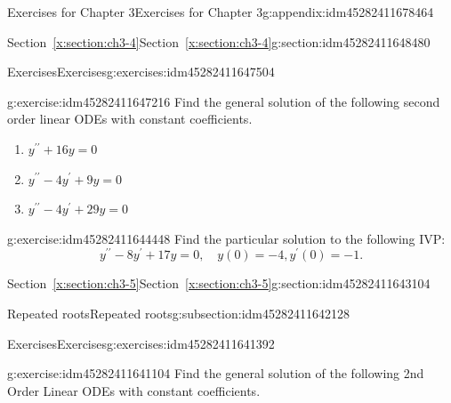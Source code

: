 \documentclass[oneside,10pt,]{book}
\numberwithin{equation}{section}
\numberwithin{equation}{section}
\begin{document}
\begin{appendixptx}{Exercises for Chapter 3}{}{Exercises for Chapter 3}{}{}{g:appendix:idm45282411678464}
\begin{sectionptx}{Section~\ref*{x:section:ch3-4}}{}{Section~\ref*{x:section:ch3-4}}{}{}{g:section:idm45282411648480}
%
%
\typeout{************************************************}
\typeout{************************************************}
%
\begin{exercises-subsection-numberless}{Exercises}{}{Exercises}{}{}{g:exercises:idm45282411647504}
\begin{divisionexercise}{1}{}{}{g:exercise:idm45282411647216}%
Find the general solution of the following second order linear ODEs with constant coefficients. %
\begin{enumerate}[label=(\alph*)]
\item{}\({\displaystyle y^{\prime\prime}+16y=0}\)%
\item{}\(y^{\prime\prime}-4y^{\prime}+9y=0\)%
\item{}\(y^{\prime\prime}-4y^{\prime}+29y=0\)%
\end{enumerate}
\end{divisionexercise}%
\begin{divisionexercise}{2}{}{}{g:exercise:idm45282411644448}%
Find the particular solution to the following IVP:%
\begin{equation*}
{\displaystyle y^{\prime\prime}-8y^{\prime}+17y=0},\,\,\,\,\,\,y(0)=-4,y^{\prime}(0)=-1.
\end{equation*}
\end{divisionexercise}%
\end{exercises-subsection-numberless}
\end{sectionptx}
%
%
\typeout{************************************************}
\typeout{************************************************}
%
\begin{sectionptx}{Section~\ref*{x:section:ch3-5}}{}{Section~\ref*{x:section:ch3-5}}{}{}{g:section:idm45282411643104}
%
%
\typeout{************************************************}
\typeout{************************************************}
%
\begin{subsectionptx}{Repeated roots}{}{Repeated roots}{}{}{g:subsection:idm45282411642128}
%
%
\typeout{************************************************}
\typeout{************************************************}
%
\begin{exercises-subsubsection-numberless}{Exercises}{}{Exercises}{}{}{g:exercises:idm45282411641392}
\begin{divisionexercise}{1}{}{}{g:exercise:idm45282411641104}%
Find the general solution of the following 2nd Order Linear ODEs with constant coefficients. %

\end{divisionexercise}
\end{exercises-subsubsection-numberless}
\end{subsectionptx}
\end{sectionptx}
\end{appendixptx}
\end{document}
